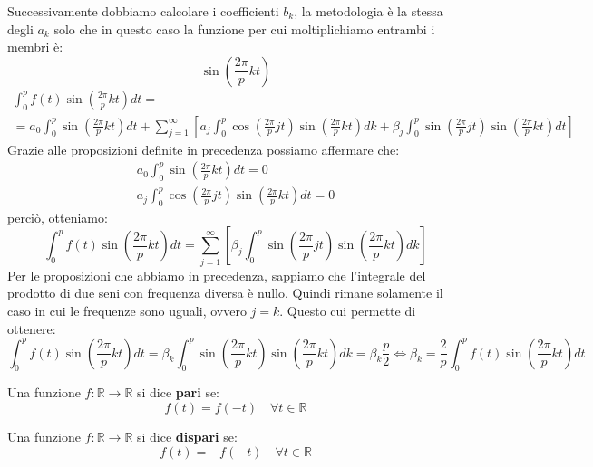 Successivamente dobbiamo calcolare i coefficienti $b_k$, la metodologia è la stessa
degli $a_k$ solo che in questo caso la funzione per cui moltiplichiamo entrambi
i membri è:
\begin{equation*}
    \sin\left(\frac{2\pi}{p}kt\right)
\end{equation*}
\begin{equation*}
    \begin{array}{l}
        \int_{0}^{p}f(t)\sin\left(\frac{2\pi}{p}kt\right) dt = \\
        = a_0 \int_{0}^{p} \sin\left(\frac{2\pi}{p}kt\right) dt + \sum_{j=1}^{\infty}
        \left[a_j\int_{0}^{p}\cos \left(\frac{2\pi}{p}jt\right)\sin\left(\frac{2\pi}{p}kt\right)dk
            + \beta_j \int_{0}^{p}\sin\left(\frac{2\pi}{p}jt\right)\sin\left(\frac{2\pi}{p}kt
            \right)dt\right]
    \end{array}
\end{equation*}
Grazie alle proposizioni definite in precedenza possiamo affermare che:
\begin{equation*}
    \begin{array}{c}
        a_0\int_{0}^{p}\sin \left(\frac{2\pi}{p}kt\right)dt = 0 \\
        a_j\int_{0}^{p}\cos\left(\frac{2\pi}{p}jt\right)\sin \left(\frac{2\pi}{p}kt\right)dt=0
    \end{array}
\end{equation*}
perciò, otteniamo:
\begin{equation*}
    \int_{0}^{p}f(t)\sin \left(\frac{2\pi}{p}kt\right) dt = \sum_{j=1}^{\infty}
    \left[\beta_j\int_{0}^{p}\sin \left(\frac{2\pi}{p}jt\right)\sin \left(
        \frac{2\pi}{p}kt\right)dk \right]
\end{equation*}
Per le proposizioni che abbiamo in precedenza, sappiamo che l'integrale del prodotto
di due seni con frequenza diversa è nullo. Quindi rimane solamente il caso in
cui le frequenze sono uguali, ovvero $j=k$. Questo cui permette di ottenere:
\begin{equation*}
    \int_{0}^{p}f(t)\sin \left(\frac{2\pi}{p}kt\right) dt = \beta_k\int_{0}^{p}\sin
    \left(\frac{2\pi}{p}kt\right)\sin \left(\frac{2\pi}{p}kt\right)dk = \beta_k \frac{p}{2}
    \iff \beta_k =\frac{2}{p}  \int_{0}^{p}f(t)\sin \left(\frac{2\pi}{p}kt\right) dt
\end{equation*}

\begin{definizione}
    Una funzione $f:\mathbb{R}\to \mathbb{R}$ si dice \textbf{pari} se:
    \begin{equation}
        f(t) = f(-t) \quad \forall t \in \mathbb{R}
    \end{equation}
\end{definizione}
\begin{definizione}
    Una funzione $f:\mathbb{R}\to \mathbb{R}$ si dice \textbf{dispari} se:
    \begin{equation}
        f(t) = -f(-t) \quad \forall t \in \mathbb{R}
    \end{equation}
\end{definizione}

